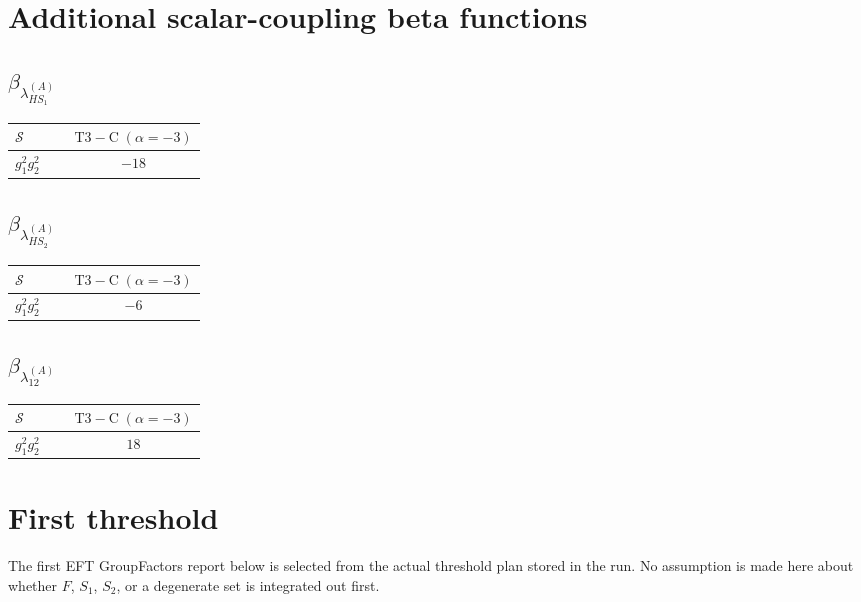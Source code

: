 \documentclass[9pt]{article}
\begin{document}
\section*{Additional scalar-coupling beta functions}
\subsection*{$ \beta_{\lambda_{HS_1}^{(A)}} $}
\begin{longtable}{@{}p{0.31\linewidth}c@{}}
\toprule
$\mathcal{S}$ & $ \mathrm{T3-C}\;(\alpha=-3) $ \\
\midrule
$ g_1^2g_2^2 $ & $ -18 $ \\
\bottomrule
\end{longtable}
\subsection*{$ \beta_{\lambda_{HS_2}^{(A)}} $}
\begin{longtable}{@{}p{0.31\linewidth}c@{}}
\toprule
$\mathcal{S}$ & $ \mathrm{T3-C}\;(\alpha=-3) $ \\
\midrule
$ g_1^2g_2^2 $ & $ -6 $ \\
\bottomrule
\end{longtable}
\subsection*{$ \beta_{\lambda_{12}^{(A)}} $}
\begin{longtable}{@{}p{0.31\linewidth}c@{}}
\toprule
$\mathcal{S}$ & $ \mathrm{T3-C}\;(\alpha=-3) $ \\
\midrule
$ g_1^2g_2^2 $ & $ 18 $ \\
\bottomrule
\end{longtable}
\section*{First threshold}
The first EFT GroupFactors report below is selected from the actual threshold plan stored in the run.  No assumption is made here about whether $F$, $S_1$, $S_2$, or a degenerate set is integrated out first.
\end{document}
